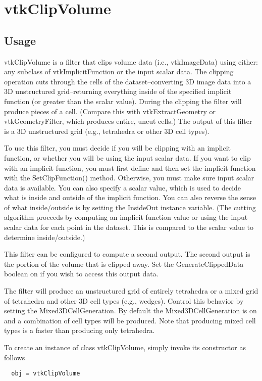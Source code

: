 \section{vtkClipVolume}

\subsection{Usage}

 vtkClipVolume is a filter that clips volume data (i.e., vtkImageData)
 using either: any subclass of vtkImplicitFunction or the input scalar
 data. The clipping operation cuts through the cells of the
 dataset--converting 3D image data into a 3D unstructured grid--returning
 everything inside of the specified implicit function (or greater than the
 scalar value). During the clipping the filter will produce pieces of a
 cell. (Compare this with vtkExtractGeometry or vtkGeometryFilter, which
 produces entire, uncut cells.) The output of this filter is a 3D
 unstructured grid (e.g., tetrahedra or other 3D cell types).

 To use this filter, you must decide if you will be clipping with an
 implicit function, or whether you will be using the input scalar data.  If
 you want to clip with an implicit function, you must first define and then
 set the implicit function with the SetClipFunction() method. Otherwise,
 you must make sure input scalar data is available. You can also specify a
 scalar value, which is used to decide what is inside and outside of the
 implicit function. You can also reverse the sense of what inside/outside
 is by setting the InsideOut instance variable. (The cutting algorithm
 proceeds by computing an implicit function value or using the input scalar
 data for each point in the dataset. This is compared to the scalar value
 to determine inside/outside.)

 This filter can be configured to compute a second output. The
 second output is the portion of the volume that is clipped away. Set the
 GenerateClippedData boolean on if you wish to access this output data.

 The filter will produce an unstructured grid of entirely tetrahedra or a
 mixed grid of tetrahedra and other 3D cell types (e.g., wedges). Control
 this behavior by setting the Mixed3DCellGeneration. By default the
 Mixed3DCellGeneration is on and a combination of cell types will be
 produced. Note that producing mixed cell types is a faster than producing
 only tetrahedra.

To create an instance of class vtkClipVolume, simply
invoke its constructor as follows
\begin{verbatim}
  obj = vtkClipVolume
\end{verbatim}
